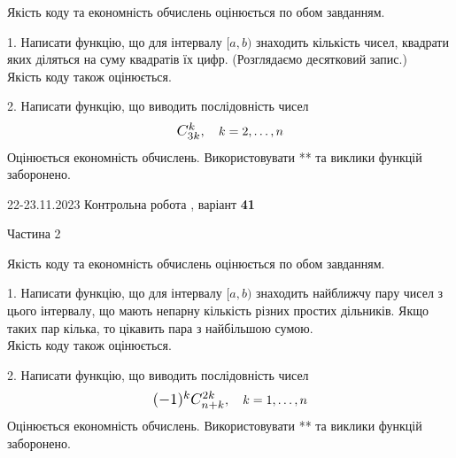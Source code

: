 \documentclass[12pt, ukrainian]{article}
\begin{document}
{{{{{{{{{{{{
\begin {Large}
Якість коду та економність обчислень оцінюється по обом завданням.

\vspace{5mm}

1. Написати функцію, що для інтервалу $[a, b)$ знаходить кількість чисел, квадрати яких діляться на суму квадратів їх цифр. (Розглядаємо десятковий запис.)\\	Якість коду також оцінюється. 



\vspace{10mm}



2. 
Написати функцію, що виводить послідовність чисел
$$\scalebox{1.2}{$C_{3k}^{k}$}, \quad k=2,\ldots,n$$
Оцінюється економність обчислень. Використовувати ** та виклики функцій заборонено.

\end{Large}\newpage




\begin {Huge}
{{22-23.11.2023 Контрольна робота , варіант  \No \textbf { 41 }\par}}

\begin{center}Частина 2
\end{center}
\vspace{10mm}
\end {Huge}

{
\begin {Large}
Якість коду та економність обчислень оцінюється по обом завданням.

\vspace{5mm}

1. Написати функцію, що для інтервалу $[a, b)$ знаходить найближчу пару чисел з цього інтервалу, що мають непарну кількість різних простих дільників. Якщо таких пар кілька, то цікавить пара з найбільшою сумою.\\	Якість коду також оцінюється. 



\vspace{10mm}



2. 
Написати функцію, що виводить послідовність чисел
$$\scalebox{1.2}{$(-1)^{k}C_{n+k}^{2k}$}, \quad k=1,\ldots,n$$
Оцінюється економність обчислень. Використовувати ** та виклики функцій заборонено.


\end{Large}}}}}}}}}}}}}}
\end{document}
